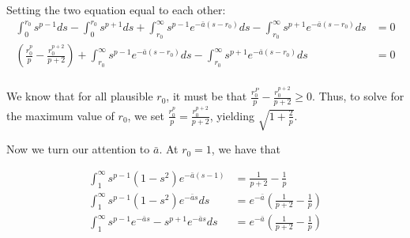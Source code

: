 \documentclass{article}
\begin{document}
Setting the two equation equal to each other:
\begin{align*}
\int_0^{r_0} s^{p-1} ds - \int_0^{r_0} s^{p+1} ds + 
        \int_{r_0}^\infty s^{p-1} e^{-\bar{a}(s - r_0)} ds - 
        \int_{r_0}^{\infty} s^{p+1} e^{- \bar{a} (s - r_0)} ds &= 0 \\
\left( \frac{r_0^p}{p} - \frac{r_0^{p+2}}{p+2} \right) + 
        \int_{r_0}^\infty s^{p-1} e^{-\bar{a}(s - r_0)} ds - 
        \int_{r_0}^{\infty} s^{p+1} e^{- \bar{a} (s - r_0)} ds &= 0 \\
\end{align*}

We know that for all plausible $r_0$, it must be that $\frac{r_0^P}{p} - \frac{r_0^{p+2}}{p+2} \geq 0$. Thus, 
to solve for the maximum value of $r_0$, we set $\frac{r_0^p}{p} = \frac{r_0^{p+2}}{p+2}$, yielding
$\sqrt{1 + \frac{2}{p}}$. 

Now we turn our attention to $\bar{a}$. At $r_0 = 1$, we have that

\begin{align*}
\int_{1}^\infty s^{p-1}(1 - s^2) e^{- \bar{a}(s - 1)} &= \frac{1}{p+2} - \frac{1}{p} \\
\int_{1}^\infty s^{p-1}(1 - s^2) e^{- \bar{a} s} ds &= e^{- \bar{a}} \left( \frac{1}{p+2} - \frac{1}{p} \right) \\
\int_{1}^\infty s^{p-1}  e^{- \bar{a} s} - s^{p+1} e^{ - \bar{a}s} ds &= e^{- \bar{a}} \left( \frac{1}{p+2} - \frac{1}{p} \right) \\
\end{align*}
\end{document}
